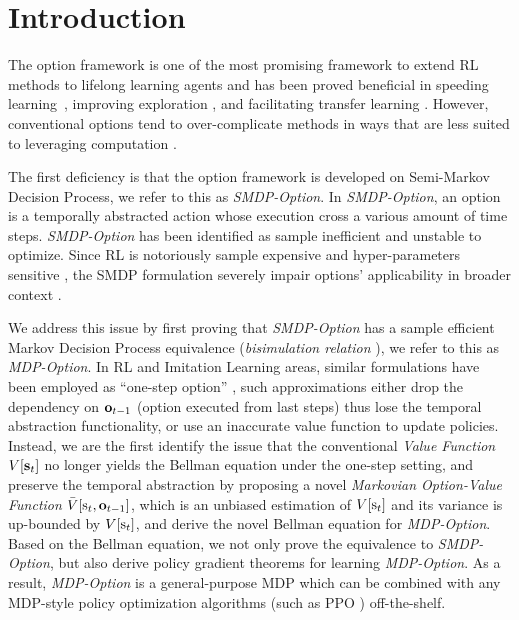 \documentclass{article}
\begin{document}
\section{Introduction}
\label{sec:intro}

The option framework \cite{sutton1999between} is one of the most
promising framework to extend RL methods to lifelong learning
agents \cite{mankowitz2016adaptive} and has been proved
beneficial in speeding learning~\cite{bacon2018temporal},
improving exploration \cite{harb2018waiting}, and facilitating
transfer learning \cite{zhang2019dac}. However, conventional
options tend to over-complicate methods in ways that are less
suited to leveraging computation \cite{bacon2018temporal}.

The first deficiency is that the option framework is developed on
Semi-Markov Decision Process, we refer to this as
\emph{SMDP-Option}. In \emph{SMDP-Option}, an option is a
temporally abstracted action whose execution cross a various
amount of time steps. \emph{SMDP-Option} has been identified
\cite{zhang2019dac} as sample inefficient and unstable to
optimize. Since RL is notoriously sample expensive and
hyper-parameters sensitive \cite{haarnoja2018soft}, the SMDP
formulation severely impair options' applicability in broader
context \cite{jong2008utility}.

We address this issue by first proving that \emph{SMDP-Option}
has a sample efficient Markov Decision Process equivalence
(\emph{bisimulation relation} \cite{givan2003equivalence}), we
refer to this as \emph{MDP-Option}. In RL
\cite{levy2011unified,zhang2019dac} and Imitation Learning
\cite{henderson2018optiongan,sharma2018directed,shankar2020learning,lee2020learning}
areas, similar formulations have been employed as ``one-step
option'' \cite{henderson2018optiongan,zhang2019dac}, such
approximations either drop the dependency on ${\mathbf{o}}_{t-1}$ (option
executed from last steps) thus lose the temporal abstraction
functionality, or use an inaccurate value function to update
policies. Instead, we are the first identify the issue that the
conventional \emph{Value Function} $V[{\mathbf{s}}_t]$ no longer yields
the Bellman equation \cite{sutton1999between} under the one-step
setting, and preserve the temporal abstraction by proposing a
novel \emph{Markovian Option-Value Function}
$\bar{V}[{\textnormal{s}}_t,{\mathbf{o}}_{t-1}]$, which is an unbiased estimation of
$V[{\textnormal{s}}_t]$ and its variance is up-bounded by $V[{\textnormal{s}}_t]$, and
derive the novel Bellman equation for \emph{MDP-Option}. Based on
the Bellman equation, we not only prove the equivalence to
\emph{SMDP-Option}, but also derive policy gradient theorems for
learning \emph{MDP-Option}. As a result, \emph{MDP-Option} is a
general-purpose MDP which can be combined with any MDP-style
\cite{zhang2019dac} policy optimization algorithms (such as PPO
\cite{witoonchart2017application}) off-the-shelf.
\end{document}
